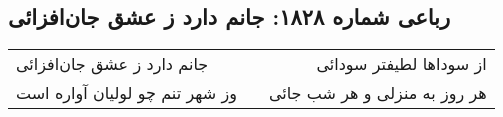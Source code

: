 \begin{center}
\section*{رباعی شماره ۱۸۲۸: جانم دارد ز عشق جان‌افزائی}
\label{sec:1828}
\begin{longtable}{l p{0.5cm} r}
جانم دارد ز عشق جان‌افزائی
&&
از سوداها لطیفتر سودائی
\\
وز شهر تنم چو لولیان آواره است
&&
هر روز به منزلی و هر شب جائی
\\
\end{longtable}
\end{center}
